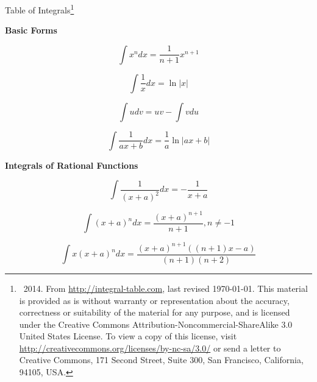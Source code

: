 \documentclass[11pt,twoside]{article}
\date{} %
\begin{document}
\begin{center}
\LARGE
Table of Integrals\footnote{\textcopyleft \ 2014. From  \url{http://integral-table.com}, last revised \today. This material 
is provided as is without warranty or representation about the accuracy, correctness or suitability of the material for any purpose, and is licensed under the Creative Commons Attribution-Noncommercial-ShareAlike 3.0 United States License. To view a copy of this license, visit \url{http://creativecommons.org/licenses/by-nc-sa/3.0/} or send a letter to Creative Commons, 171 Second Street, Suite 300, San Francisco, California, 94105, USA. } 



\end{center}
\normalsize
\begin{multicols}{3}

\begin{footnotesize}
\begin{center} \textbf{Basic Forms}
\end{center}

\begin{equation}
\int x^n dx = \frac{1}{n+1}x^{n+1}
\end{equation}

\begin{equation}
\int \frac{1}{x}dx = \ln |x|
\end{equation}

\begin{equation}
\int u dv = uv - \int v du
\end{equation}

\begin{equation}
\int \frac{1}{ax+b}dx = \frac{1}{a} \ln |ax + b| 
\end{equation}

\begin{center} \textbf {Integrals of Rational Functions} \end{center}

\begin{equation}
\int \frac{1}{(x+a)^2}dx = -\frac{1}{x+a}
\end{equation}

\begin{equation}
\int (x+a)^n dx = \frac{(x+a)^{n+1}}{n+1}, n\ne -1
\end{equation}

\begin{equation}
\int x(x+a)^n dx = \frac{(x+a)^{n+1} ( (n+1)x-a)}{(n+1)(n+2)}
\end{equation}


\end{footnotesize}
\end{multicols}
\end{document}
